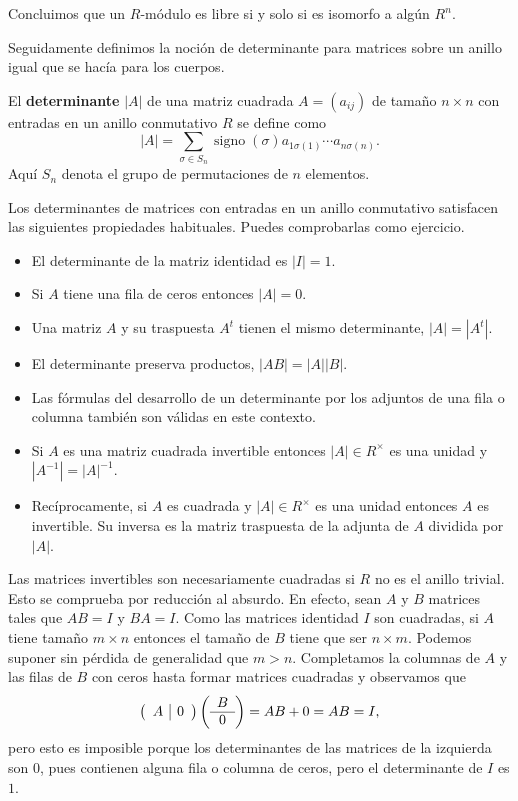 Concluimos que un \(R\)-módulo es libre si y solo si es isomorfo a algún
\(R^n\). 

Seguidamente definimos la noción de determinante para matrices sobre un
anillo igual que se hacía para los cuerpos.


El \textbf{determinante} \(|A|\) de una matriz cuadrada \(A=(a_{ij})\)
de tamaño \(n\times n\) con entradas en un anillo conmutativo \(R\) se
define como
\[|A|=\sum_{\sigma\in S_n}\operatorname{signo}(\sigma)a_{1\sigma(1)}\cdots a_{n\sigma(n)}.\]
Aquí \(S_n\) denota el grupo de permutaciones de \(n\) elementos.


Los determinantes de matrices con entradas en un anillo conmutativo
satisfacen las siguientes propiedades habituales. Puedes comprobarlas
como ejercicio.

\begin{itemize}
\item
  El determinante de la matriz identidad es \(|I|=1\).
\item
  Si \(A\) tiene una fila de ceros entonces \(|A|=0\).
\item
  Una matriz \(A\) y su traspuesta \(A^t\) tienen el mismo determinante,
  \(|A|=|A^t|\).
\item
  El determinante preserva productos, \(|AB|=|A||B|\).
\item
  Las fórmulas del desarrollo de un determinante por los adjuntos de una
  fila o columna también son válidas en este contexto.
\item
  Si \(A\) es una matriz cuadrada invertible entonces
  \(|A|\in R^{\times}\) es una unidad y \(|A^{-1}|=|A|^{-1}\).
\item
  Recíprocamente, si \(A\) es cuadrada y \(|A|\in R^{\times}\) es una
  unidad entonces \(A\) es invertible. Su inversa es la matriz
  traspuesta de la adjunta de \(A\) dividida por \(|A|\).
\end{itemize}

Las matrices invertibles son necesariamente cuadradas si \(R\) no es el
anillo trivial. Esto se comprueba por reducción al absurdo. En efecto,
sean \(A\) y \(B\) matrices tales que \(AB=I\) y \(BA=I\). Como las
matrices identidad \(I\) son cuadradas, si \(A\) tiene tamaño
\(m\times n\) entonces el tamaño de \(B\) tiene que ser \(n\times m\).
Podemos suponer sin pérdida de generalidad que \(m>n\). Completamos la
columnas de \(A\) y las filas de \(B\) con ceros hasta formar matrices
cuadradas y observamos que
\[\left(\begin{array}{c|c}A&0\end{array}\right)\left(\begin{array}{c}B\cr \hline 0\end{array}\right)=AB+0=AB=I,\]
pero esto es imposible porque los determinantes de las matrices de la
izquierda son \(0\), pues contienen alguna fila o columna de ceros, pero
el determinante de \(I\) es \(1\). 

